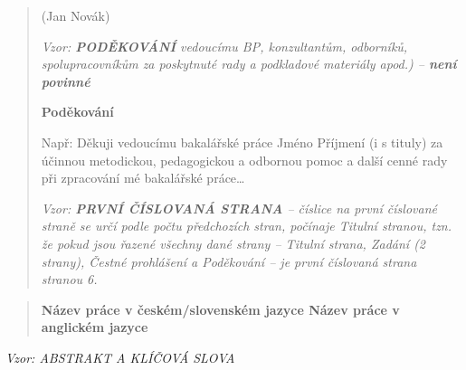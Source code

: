 \documentclass[
]{article}
\begin{document}
\begin{quote}
        (Jan Novák)

        \newpage
        \thispagestyle{empty}
        \emph{Vzor: \textbf{PODĚKOVÁNÍ} vedoucímu BP, konzultantům, odborníků,
            spolupracovníkům za poskytnuté rady a podkladové materiály apod.) --
            \textbf{není povinné}}

        \textbf{Poděkování}

        Např: Děkuji vedoucímu bakalářské práce Jméno Příjmení (i s tituly) za
        účinnou metodickou, pedagogickou a odbornou pomoc a další cenné rady při
        zpracování mé bakalářské práce\ldots{}

        \newpage
        \emph{Vzor: \textbf{PRVNÍ ČÍSLOVANÁ STRANA} -- číslice na první
        číslované straně se určí podle počtu předchozích stran, počínaje Titulní
        stranou, tzn. že pokud jsou řazené všechny dané strany -- Titulní
        strana, Zadání (2 strany), Čestné prohlášení a Poděkování -- je první
        číslovaná strana stranou 6.}
    \end{quote}

    \begin{quote}
        \textbf{Název práce v českém/slovenském jazyce Název práce v anglickém
        jazyce}
    \end{quote}

    \emph{Vzor: ABSTRAKT A KLÍČOVÁ SLOVA}
\end{document}
